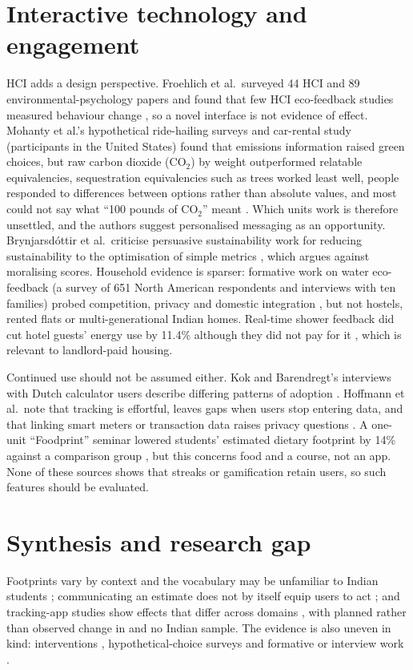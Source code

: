 \documentclass[10pt,a4paper,twocolumn]{article}
\begin{document}
\section{Interactive technology and engagement}
HCI adds a design perspective. Froehlich et al.\ surveyed 44 HCI and 89 environmental-psychology papers and found that few HCI eco-feedback studies measured behaviour change \cite{froehlich2010}, so a novel interface is not evidence of effect. Mohanty et al.'s hypothetical ride-hailing surveys and car-rental study (participants in the United States) found that emissions information raised green choices, but raw carbon dioxide (CO$_2$) by weight outperformed relatable equivalencies, sequestration equivalencies such as trees worked least well, people responded to differences between options rather than absolute values, and most could not say what ``100 pounds of CO$_2$'' meant \cite{mohanty2023}. Which units work is therefore unsettled, and the authors suggest personalised messaging as an opportunity. Brynjarsd\'ottir et al.\ criticise persuasive sustainability work for reducing sustainability to the optimisation of simple metrics \cite{brynjarsdottir2012}, which argues against moralising scores. Household evidence is sparser: formative work on water eco-feedback (a survey of 651 North American respondents and interviews with ten families) probed competition, privacy and domestic integration \cite{froehlich2012}, but not hostels, rented flats or multi-generational Indian homes. Real-time shower feedback did cut hotel guests' energy use by 11.4\% although they did not pay for it \cite{tiefenbeck2019}, which is relevant to landlord-paid housing.

Continued use should not be assumed either. Kok and Barendregt's interviews with Dutch calculator users describe differing patterns of adoption \cite{kok2021}. Hoffmann et al.\ note that tracking is effortful, leaves gaps when users stop entering data, and that linking smart meters or transaction data raises privacy questions \cite{hoffmann2024}. A one-unit ``Foodprint'' seminar lowered students' estimated dietary footprint by 14\% against a comparison group \cite{malan2020}, but this concerns food and a course, not an app. None of these sources shows that streaks or gamification retain users, so such features should be evaluated.

\section{Synthesis and research gap}
Footprints vary by context and the vocabulary may be unfamiliar to Indian students \cite{lee2021,gandhi2025,grinstein2018}; communicating an estimate does not by itself equip users to act \cite{mulrow2019,collins2020}; and tracking-app studies show effects that differ across domains \cite{hoffmann2024,lasarov2024}, with planned rather than observed change in \cite{hoffmann2024} and no Indian sample. The evidence is also uneven in kind: interventions \cite{lasarov2024,malan2020,tiefenbeck2019}, hypothetical-choice surveys \cite{mohanty2023} and formative or interview work \cite{froehlich2012,kok2021}.
\end{document}
